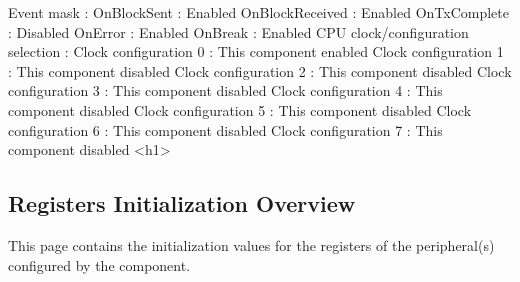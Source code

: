 \begin{DoxyCode}
              Event mask                                   : 
                OnBlockSent                                : Enabled
                OnBlockReceived                            : Enabled
                OnTxComplete                               : Disabled
                OnError                                    : Enabled
                OnBreak                                    : Enabled
            CPU clock/configuration selection              : 
              Clock configuration 0                        : This component enabled
              Clock configuration 1                        : This component disabled
              Clock configuration 2                        : This component disabled
              Clock configuration 3                        : This component disabled
              Clock configuration 4                        : This component disabled
              Clock configuration 5                        : This component disabled
              Clock configuration 6                        : This component disabled
              Clock configuration 7                        : This component disabled
<h1>
\end{DoxyCode}
 \hypertarget{ASerialLdd2_regs_overview}{}\subsection{Registers Initialization Overview}\label{ASerialLdd2_regs_overview}
This page contains the initialization values for the registers of the peripheral(s) configured by the component. \tabulinesep=1mm
